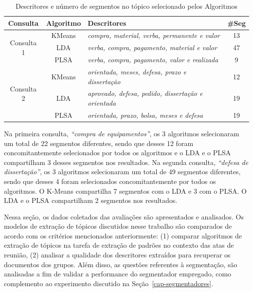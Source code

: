 \begin{table}[!h]
\begin{tabular}{|c|c|l|c|}
 \hline 
 \textbf{Consulta} &\textbf{Algoritmo }& \textbf{Descritores }& \textbf{\#Seg} \\ \hline
 \multirow{3}{*}{Consulta 1} &
 KMeans & \textit{compra, material, verba, permanente e valor} & 13 \\  \cline{2-4} 
 & LDA    & \textit{verba, compra, pagamento, material e valor}  & 47 \\  \cline{2-4}
 & PLSA   & \textit{verba, compra, pagamento, valor e realizada} & 9  \\  \hline 
 \multirow{3}{*}{Consulta 2} &
 KMeans & \textit{orientada, meses, defesa, prazo e dissertação} & 12 \\  \cline{2-4}
 & LDA    & \textit{aprovado, defesa, pedido, dissertação e orientada} & 19 \\ \cline{2-4} 
 & PLSA   & \textit{orientada, prazo, bolsa, meses e defesa} & 19 \\  \hline 
 \end{tabular}  
 \label{tab:segquanti}
 \caption{Descritores e número de segmentos no tópico selecionado pelos Algoritmos}
\end{table} 

Na primeira consulta, \textit{``compra de equipamentos''},  os 3 algoritmos selecionaram um total de 22 segmentos diferentes, sendo que desses 12 foram concomitantemente selecionados por todos os algoritmos e o LDA e o PLSA compartilham 3 desses segmentos nos resultados.
Na segunda  consulta, \textit{``defesa de dissertação''}, os 3 algoritmos selecionaram um total de 49 segmentos diferentes, sendo que desses 4 foram selecionados concomitantemente por todos os algoritmos. O K-Means compartilha 7 segmentos com o LDA e 3 com o PLSA. O LDA e o PLSA compartilham 2 segmentos nos resultados.



Nessa seção, os dados coletados das avaliações são apresentados e analisados. Os modelos de extração de tópicos discutidos nesse trabalho são comparados de acordo com os critérios mencionados anteriormente: 
(1) comparar algoritmos de extração de tópicos na tarefa de extração de padrões no contexto das atas de reunião, 
(2) analisar a qualidade dos descritores extraídos para recuperar os documentos dos grupos.
Além disso, as questões referentes à segmentação, são analisadas a fim de 
validar a performance do segmentador empregado, como complemento ao experimento discutido na Seção~\ref{cap-segmentadores}.


